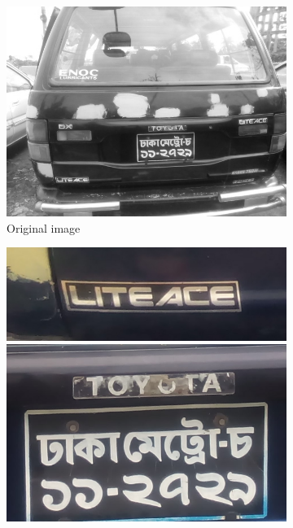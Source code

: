 \begin{figure}
\begin{subfigure}{0.5\textwidth}
    \centering
    \includegraphics[width=0.9\linewidth]{./img/experiment/stage.2/private}
    \caption{Original image}
\end{subfigure}
\begin{subfigure}{0.24\textwidth}
    \centering
    \includegraphics[width=0.9\linewidth]{./img/experiment/stage.8/00-private}
    \\ \vspace{0.3cm}
    \includegraphics[width=0.9\linewidth]{./img/experiment/stage.8/02-private}

\end{subfigure}
\end{figure}
